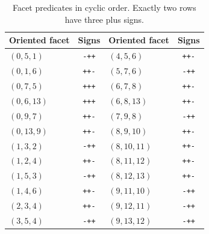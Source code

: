 \begin{table}[ht]
\centering\small
\caption{Facet predicates in cyclic order. Exactly two rows have three plus signs.}\label{tab:faceledger}
\begin{tabular}{lc@{\qquad\qquad}lc}
\toprule
Oriented facet & Signs & Oriented facet & Signs\\
\midrule
$(0,5,1)$ & \texttt{-++} & $(4,5,6)$ & \texttt{++-}\\
$(0,1,6)$ & \texttt{++-} & $(5,7,6)$ & \texttt{-++}\\
$(0,7,5)$ & \texttt{+++} & $(6,7,8)$ & \texttt{++-}\\
$(0,6,13)$ & \texttt{+++} & $(6,8,13)$ & \texttt{++-}\\
$(0,9,7)$ & \texttt{++-} & $(7,9,8)$ & \texttt{-++}\\
$(0,13,9)$ & \texttt{++-} & $(8,9,10)$ & \texttt{++-}\\
$(1,3,2)$ & \texttt{-++} & $(8,10,11)$ & \texttt{++-}\\
$(1,2,4)$ & \texttt{++-} & $(8,11,12)$ & \texttt{++-}\\
$(1,5,3)$ & \texttt{-++} & $(8,12,13)$ & \texttt{++-}\\
$(1,4,6)$ & \texttt{++-} & $(9,11,10)$ & \texttt{-++}\\
$(2,3,4)$ & \texttt{++-} & $(9,12,11)$ & \texttt{-++}\\
$(3,5,4)$ & \texttt{-++} & $(9,13,12)$ & \texttt{-++}\\
\bottomrule
\end{tabular}
\end{table}
\clearpage

